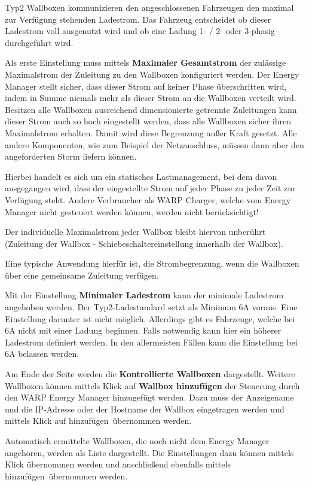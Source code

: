 \documentclass[a4paper,10pt]{article}
\newcommand{\hint}[1]{\begin{tcolorbox}[colback=boxgray,colframe=black,coltext=
white,title=Hinweis,left*=2mm,right*=2mm,boxsep=1mm,bottom=1mm,top=1mm]#1\end{tcolorbox}}
\begin{document}
\begin{multicols*}{2}
	Typ2 Wallboxen kommunizieren den angeschlossenen Fahrzeugen den maximal zur
	Verfügung stehenden Ladestrom. Das Fahrzeug entscheidet ob dieser Ladestrom
	voll ausgenutzt wird und ob eine Ladung 1- / 2- oder 3-phasig durchgeführt
	wird.

	Als erste Einstellung muss mittels \textbf{Maximaler Gesamtstrom} der 
	zulässige Maximalstrom der Zuleitung zu den Wallboxen konfiguriert werden. 
	Der Energy Manager stellt sicher, dass dieser
	Strom auf keiner Phase überschritten wird, indem in Summe niemals mehr als
	dieser Strom an die Wallboxen verteilt wird. Besitzen alle Wallboxen
	ausreichend dimensionierte getrennte Zuleitungen kann dieser Strom auch so
	hoch eingestellt werden, dass alle Wallboxen sicher ihren Maximalstrom
	erhalten. Damit wird diese Begrenzung außer Kraft gesetzt. Alle andere
	Komponenten, wie zum Beispiel der Netzanschluss, müssen dann aber den
	angeforderten Storm liefern können. 

	\hint{Hierbei handelt es sich um ein statisches Lastmanagement, bei dem
	davon ausgegangen wird, dass der eingestellte Strom auf jeder Phase
	zu jeder Zeit zur Verfügung steht. Andere Verbraucher als WARP Charger, 
	welche vom Energy Manager nicht gesteuert werden können, werden nicht
	berücksichtigt!}

	Der individuelle Maximalstrom jeder Wallbox bleibt hiervon unberührt
	(Zuleitung der Wallbox - Schiebeschaltereinstellung innerhalb der Wallbox).

	Eine typische Anwendung hierfür ist, die Strombegrenzung, 
	wenn die Wallboxen über eine gemeinsame Zuleitung verfügen.

	Mit der Einstellung \textbf{Minimaler Ladestrom} kann der minimale Ladestrom
	angehoben werden. Der Typ2-Ladestandard setzt als Minimum 6A voraus. Eine
	Einstellung darunter ist nicht möglich. Allerdings gibt es Fahrzeuge, welche 
	bei 6A nicht mit einer Ladung beginnen. Falls notwendig kann hier ein höherer 
	Ladestrom definiert werden. In den allermeisten Fällen kann die Einstellung
	bei 6A belassen werden.

	Am Ende der Seite werden die \textbf{Kontrollierte
	Wallboxen} dargestellt. Weitere Wallboxen können mittels Klick auf
	\textbf{Wallbox hinzufügen} der Steuerung durch den WARP Energy Manager
	hinzugefügt werden. Dazu muss der Anzeigename und die IP-Adresse oder der
	Hostname der Wallbox eingetragen werden und mittels Klick auf \glqq
	hinzufügen\grqq~übernommen werden.

	Automatisch ermittelte Wallboxen, die noch nicht dem Energy Manager
	angehören, werden als Liste dargestellt. Die Einstellungen dazu können
	mittels Klick übernommen werden und anschließend ebenfalls mittels \glqq
	hinzufügen\grqq~übernommen werden.


\end{multicols*}
\end{document}
